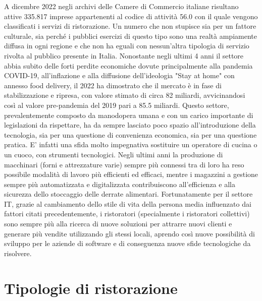 \documentclass[a4paper, titlepage, 12pt, openright, twoside]{book}
\begin{document}
A dicembre 2022 negli archivi delle Camere di Commercio italiane risultano attive 335.817 
imprese appartenenti al codice di attività 56.0 con il quale vengono classificati i servizi di ristorazione.
Un numero che non stupisce sia per un fattore culturale, sia perché i pubblici esercizi di questo tipo sono
una realtà ampiamente diffusa in ogni regione e che non ha eguali con nessun'altra tipologia di servizio rivolta al pubblico presente in Italia.
\newline
Nonostante negli ultimi 4 anni il settore abbia subito delle forti perdite economiche dovute principalmente alla pandemia COVID-19,
all'inflazione e alla diffusione dell'ideologia "Stay at home" con annesso food delivery, 
il 2022 ha dimostrato che il mercato è in fase di stabilizzazione e ripresa, con valore stimato di circa 82 miliardi,
avvicinandosi così al valore pre-pandemia del 2019 pari a 85.5 miliardi. \cite{rristorazione}
\newline
Questo settore, prevalentemente composto da manodopera umana e con un carico importante di legislazioni da rispettare, ha da sempre lasciato poco spazio all’introduzione della tecnologia, sia per una questione di convenienza economica, sia per una questione pratica. E’ infatti una sfida molto impegnativa sostituire un operatore di cucina o un cuoco, con strumenti tecnologici. Negli ultimi anni la produzione di macchinari (forni e attrezzature varie) sempre più connessi tra di loro ha reso possibile modalità di lavoro più efficienti ed efficaci, mentre i magazzini a gestione sempre più automatizzata e digitalizzata contribuiscono all'efficienza e alla sicurezza dello stoccaggio delle derrate alimentari.
\newline
Fortunatamente per il settore IT, grazie al cambiamento dello stile di vita della persona media influenzato dai fattori citati precedentemente,
i ristoratori (specialmente i ristoratori collettivi) sono sempre più alla ricerca di nuove soluzioni per attrarre nuovi clienti
e generare più vendite utilizzando gli stessi locali, aprendo così nuove possibilità di sviluppo per le aziende di software e di conseguenza nuove sfide tecnologiche da risolvere.

\section{Tipologie di ristorazione}
\end{document}
